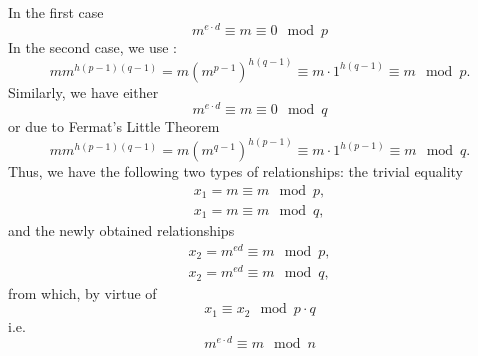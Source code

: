 In the first case 
\[
m^{e\cdot d} \equiv m \equiv 0 \mod{p}
\]
In the second case, we use
:
\[
m m^{h \left(p - 1\right)\left(q - 1\right)} 
= m \left(m^{p - 1}\right)^{h \left(q - 1\right)} \equiv m \cdot 1^{h
  \left(q - 1\right)} \equiv m \mod{p}.
\]
Similarly, we have either
\[
m^{e\cdot d} \equiv m \equiv 0 \mod{q}
\]
or due to Fermat's Little Theorem
\[
m m^{h \left(p - 1\right)\left(q - 1\right)} 
= m \left(m^{q - 1}\right)^{h \left(p - 1\right)} \equiv m \cdot 1^{h
  \left(p - 1\right)} \equiv m \mod{q}.
\]
Thus, we have the following two types of relationships:
the trivial equality
\begin{eqnarray}
x_1 = m \equiv m \mod p,
\nonumber \\
x_1 = m \equiv m \mod q,
\nonumber
\end{eqnarray}
and the newly obtained relationships
\begin{eqnarray}
x_2 = m^{ed} \equiv m \mod p,
\nonumber \\
x_2 = m^{ed} \equiv m \mod q,
\nonumber
\end{eqnarray}
from which, by virtue of 
\[
x_1 \equiv x_2 \mod p \cdot q
\]
i.e.
\[
m^{e\cdot d} \equiv m \mod n
\]
